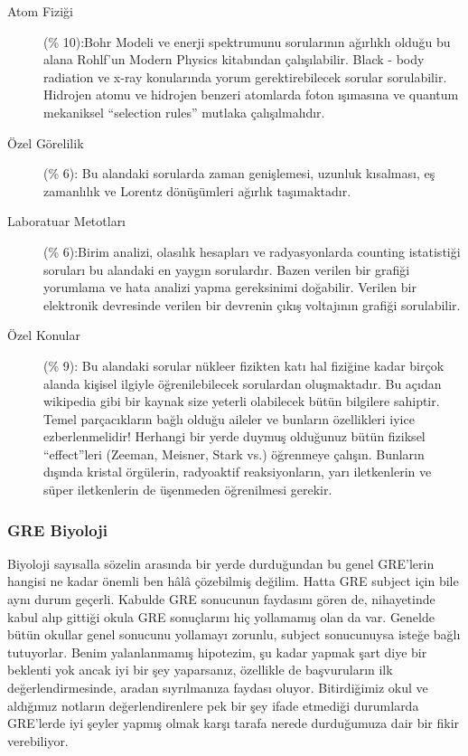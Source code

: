 \documentclass[12pt]{article}
\theoremstyle{break}
\begin{document}
\begin{description}
\item[Atom Fiziği] (\% 10):Bohr Modeli ve enerji spektrumunu sorularının ağırlıklı olduğu bu alana Rohlf’un Modern Physics kitabından çalışılabilir. Black - body radiation ve x-ray konularında yorum gerektirebilecek sorular sorulabilir. Hidrojen atomu ve hidrojen benzeri atomlarda foton ışımasına ve quantum mekaniksel “selection rules” mutlaka çalışılmalıdır.
\item[Özel Görelilik] (\% 6): Bu alandaki sorularda zaman genişlemesi, uzunluk kısalması, eş zamanlılık ve Lorentz dönüşümleri ağırlık taşımaktadır. 
\item[Laboratuar Metotları] (\% 6):Birim analizi, olasılık hesapları ve radyasyonlarda counting istatistiği soruları bu alandaki en yaygın sorulardır. Bazen verilen bir grafiği yorumlama ve hata analizi yapma gereksinimi doğabilir. Verilen bir elektronik devresinde verilen bir devrenin çıkış voltajının grafiği sorulabilir. 
\item[Özel Konular] (\% 9): Bu alandaki sorular nükleer fizikten katı hal fiziğine kadar birçok alanda kişisel ilgiyle öğrenilebilecek sorulardan oluşmaktadır. Bu açıdan wikipedia gibi bir kaynak size yeterli olabilecek bütün bilgilere sahiptir. Temel parçacıkların bağlı olduğu aileler ve bunların özellikleri iyice ezberlenmelidir! Herhangi bir yerde duymuş olduğunuz bütün fiziksel “effect”leri (Zeeman, Meisner, Stark vs.) öğrenmeye çalışın. Bunların dışında kristal örgülerin, radyoaktif reaksiyonların, yarı iletkenlerin ve süper iletkenlerin de üşenmeden öğrenilmesi gerekir. 

\end{description}

\subsubsection{GRE Biyoloji}

Biyoloji sayısalla sözelin arasında bir yerde durduğundan bu genel GRE’lerin hangisi ne kadar önemli ben hâlâ çözebilmiş değilim. Hatta GRE subject için bile aynı durum geçerli. Kabulde GRE sonucunun faydasını gören de,  nihayetinde kabul alıp gittiği okula GRE sonuçlarını hiç yollamamış olan da var. Genelde bütün okullar genel sonucunu yollamayı zorunlu, subject sonucunuysa isteğe bağlı tutuyorlar. Benim yalanlanmamış hipotezim, şu kadar yapmak şart diye bir beklenti yok ancak iyi bir şey yaparsanız, özellikle de başvuruların ilk değerlendirmesinde, aradan sıyrılmanıza faydası oluyor. Bitirdiğimiz okul ve aldığımız notların değerlendirenlere pek bir şey ifade etmediği durumlarda GRE’lerde iyi şeyler yapmış olmak karşı tarafa nerede durduğumuza dair bir fikir verebiliyor.
\end{document}
